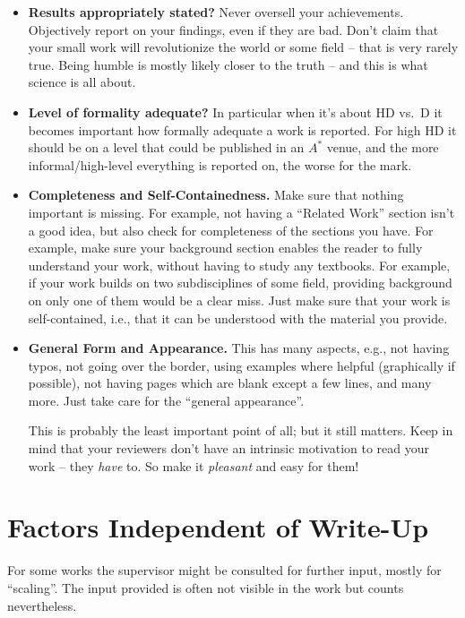 \begin{itemize}
  \item \textbf{Results appropriately stated?} Never oversell your achievements. Objectively report on your findings, even if they are bad. Don't claim that your small work will revolutionize the world or some field -- that is very rarely true. Being humble is mostly likely closer to the truth -- and this is what science is all about.
  \item \textbf{Level of formality adequate?} In particular when it's about HD vs.\ D it becomes important how formally adequate a work is reported. For high HD it should be on a level that could be published in an $A^*$ venue, and the more informal/high-level everything is reported on, the worse for the mark.
  \item \textbf{Completeness and Self-Containedness.} Make sure that nothing important is missing. For example, not having a ``Related Work'' section isn't a good idea, but also check for completeness of the sections you have. For example, make sure your background section enables the reader to fully understand your work, without having to study any textbooks. For example, if your work builds on two subdisciplines of some field, providing background on only one of them would be a clear miss. Just make sure that your work is self-contained, i.e., that it can be understood with the material you provide.
  \item \textbf{General Form and Appearance.} This has many aspects, e.g., not having typos, not going over the border, using examples where helpful (graphically if possible), not having pages which are blank except a few lines, and many more. Just take care for the ``general appearance''.
  
  This is probably the least important point of all; but it still matters. Keep in mind that your reviewers don't have an intrinsic motivation to read your work -- they \emph{have} to. So make it \emph{pleasant} and easy for them!
\end{itemize}


\section{Factors Independent of Write-Up}

For some works the supervisor might be consulted for further input, mostly for ``scaling''. The input provided is often not visible in the work but counts nevertheless.

